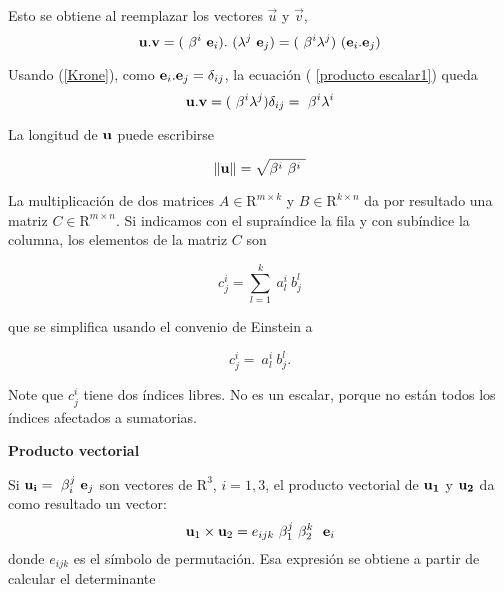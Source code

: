 \bigskip
Esto se obtiene al reemplazar  los vectores  $\vec{u}$ y $\vec{v}$, 
\begin{equation}
\bold{u}.\bold{v}= (~\beta^i~\bold{e}_i).~(\lambda^j~\bold{e}_j)=(~\beta^i \lambda^j) ~(\bold{e}_i.\bold{e}_j)
\label{producto escalar1}
\end{equation}

\bigskip
Usando (\ref{Krone}), como   $\bold{e}_i.\bold{e}_j=\delta_{ij}$, la ecuación ( \ref{producto escalar1}) queda
\begin{equation}
\bold{u}.\bold{v}= (~\beta^i \lambda^j) \delta_{ij}=  ~\beta^i\lambda^i
\label{producto escalar2}
\end{equation}
\bigskip

La  longitud de $\bold{u}$ puede escribirse

\bigskip


$$\left\|\bold{u}\right\|=\sqrt{\beta^i~\beta^i~}$$


La multiplicación de dos matrices $A\in \mathrm{R}^{m\times k }$ y $B\in \mathrm{R}^{k\times n }$ da por resultado una matriz $C\in \mathrm{R}^{m\times n }$. Si indicamos con el supraíndice la fila y con subíndice la columna,  los  elementos de la matriz $C$ son 

\bigskip


$$c^i_j=\sum_{l=1} ^k~a_l^i~b_j^l$$

\bigskip

\noindent
que se simplifica usando el convenio de Einstein a 

$$c^i_j=~a_l^i~b_j^l.$$

\bigskip

\noindent

\begin{remark}
Note que $c^i_j$ tiene dos índices libres. No es un escalar, porque no están todos los índices afectados a sumatorias.
\end{remark}
\newpage
\noindent
\textbf{Producto vectorial}

Si $\bold{u_i}= ~\beta_i^j~\bold{e}_j$  son vectores de $\mathrm{R}^{3}$, $i=1,3$, el producto vectorial  de $\bold{u_1}$ y $\bold{u_2}$ da como resultado un vector:
\begin{equation}
\bold{u}_1 \times\bold{u}_2= e_{ijk}~\beta_1^j~\beta_2^k~~\bold{e}_i
\label{producto vectorial}
\end{equation}
donde $e_{ijk}$ es el símbolo de permutación. 
\bigskip
Esa expresión se obtiene a partir de calcular el determinante 

